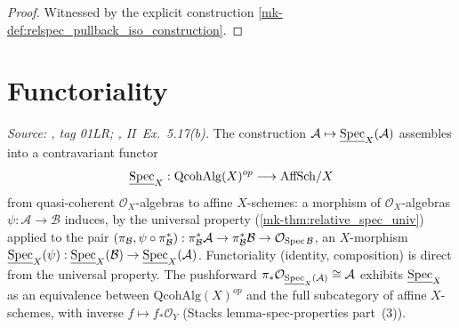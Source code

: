 \begin{proof}
  Witnessed by the explicit construction
  \ref{mk-def:relspec_pullback_iso_construction}.
\end{proof}

\section{Functoriality}
\label{mk-sec:relspec_functoriality}

\begin{theorem}
  \label{mk-thm:relative_spec_functorial}
  \textit{Source: \cite{stacks-project}, tag 01LR; \cite{hartshorne-ag}, II~Ex.~5.17(b).}
  The construction \(\mathcal{A} \mapsto \underline{\operatorname{Spec}}_X(\mathcal{A})\) assembles into
  a contravariant functor
  \[
    \underline{\operatorname{Spec}}_X : \mathrm{QcohAlg}(X)^{op} \longrightarrow \mathrm{AffSch}/X
  \]
  from quasi-coherent \(\mathcal{O}_X\)-algebras to affine \(X\)-schemes: a morphism of
  \(\mathcal{O}_X\)-algebras \(\psi : \mathcal{A} \to \mathcal{B}\) induces, by the universal
  property (\ref{mk-thm:relative_spec_univ}) applied to the pair
  $(\pi_{\mathcal{B}}, \psi \circ \pi_{\mathcal{B}}^*) :
  \pi_{\mathcal{B}}^*\mathcal{A} \to \pi_{\mathcal{B}}^*\mathcal{B} \to
  \mathcal{O}_{\operatorname{Spec}\mathcal{B}}$,
  an \(X\)-morphism
  \(\underline{\operatorname{Spec}}_X(\psi) : \underline{\operatorname{Spec}}_X(\mathcal{B}) \to \underline{\operatorname{Spec}}_X(\mathcal{A})\).
  Functoriality (identity, composition) is direct from the universal property. The
  pushforward \(\pi_* \mathcal{O}_{\underline{\operatorname{Spec}}_X(\mathcal{A})} \cong \mathcal{A}\)
  exhibits \(\underline{\operatorname{Spec}}_X\) as an equivalence between \(\mathrm{QcohAlg}(X)^{op}\) and
  the full subcategory of affine \(X\)-schemes, with inverse \(f \mapsto f_* \mathcal{O}_Y\)
  (Stacks lemma-spec-properties part~(3)).
\end{theorem}

